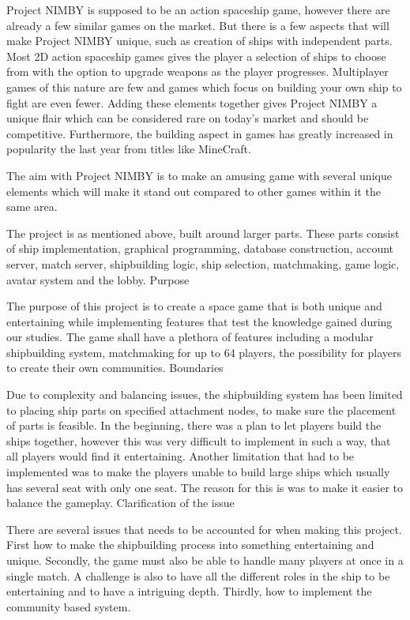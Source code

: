 \documentclass[11pt]{report}
\begin{document}
Project NIMBY is supposed to be an action spaceship game, however there are already a few similar games on the market. But there is a few aspects that will make Project NIMBY unique, such as creation of ships with independent parts. Most 2D action spaceship games gives the player a selection of ships to choose from with the option to upgrade weapons as the player progresses. Multiplayer games of this nature are few and games which focus on building your own ship to fight are even fewer. Adding these elements together gives Project NIMBY a unique flair which can be considered rare on today’s market and should be competitive. Furthermore, the building aspect in games has greatly increased in popularity the last year from titles like MineCraft. 

The aim with Project NIMBY is to make an amusing game with several unique elements which will make it stand out compared to other games within it the same area.

The project is as mentioned above, built around larger parts. These parts consist of ship implementation, graphical programming, database construction, account server, match server, shipbuilding logic, ship selection, matchmaking, game logic, avatar system and the lobby. 
Purpose

The purpose of this project is to create a space game that is both unique and entertaining while implementing features that test the knowledge gained during our studies. The game shall have a plethora of features including a modular shipbuilding system, matchmaking for up to 64 players, the possibility for players to create their own communities.
Boundaries

Due to complexity and balancing issues, the shipbuilding system has been limited to placing ship parts on specified attachment nodes, to make sure the placement of parts is feasible. In the beginning, there was a plan to let players build the ships together, however this was very difficult to implement in such a way, that all players would find it entertaining. Another limitation that had to be implemented was to make the players unable to build large ships which usually has several seat with only one seat. The reason for this is was to make it easier to balance the gameplay.  
Clarification of the issue

There are several issues that needs to be accounted for when making this project. First how to make the shipbuilding process into something entertaining and unique. Secondly, the game must also be able to handle many players at once in a single match. A challenge is also to have all the different roles in the ship to be entertaining and to have a intriguing depth. Thirdly, how to implement the community based system.
\end{document}
